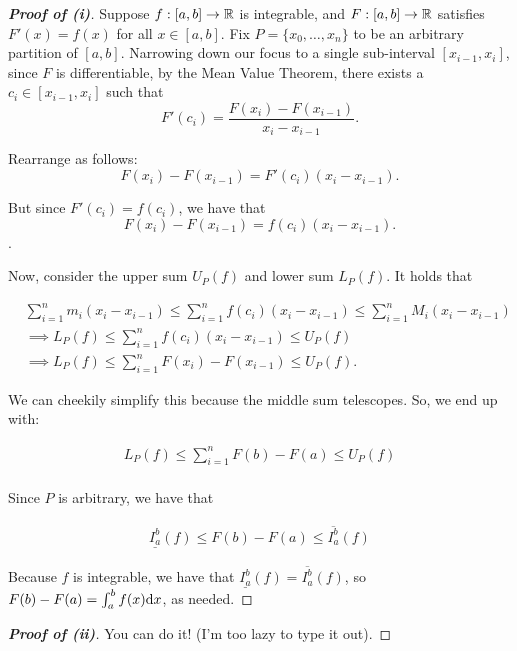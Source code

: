 \documentclass{article}
\begin{document}
  \begin{proof}[\textbf{Proof of (i)}]
    Suppose \(f:[a,b] \to \mathbb{R}\) is integrable, and \(F:[a,b] \to \mathbb{R}\) satisfies \(F'(x) = f(x)\) for all \(x \in [a,b].\) Fix \(P = \{x_0,\ldots, x_n\}\) to be an arbitrary partition of \([a,b]\). Narrowing down our focus to a single sub-interval \([x_{i-1},x_i]\), since \(F\) is differentiable, by the Mean Value Theorem, there exists a \(c_i \in [x_{i-1},x_i]\) such that
    \[
      F'(c_i) = \frac{F(x_i) - F(x_{i-1})}{x_i - x_{i-1}}.
    \] 

    Rearrange as follows:
    \[
      F(x_i) - F(x_{i-1}) = F'(c_i)(x_i - x_{i-1}).
    \]

    But since \(F'(c_i) = f(c_i)\), we have that
    \[
      F(x_i) - F(x_{i-1}) = f(c_i)(x_i - x_{i-1}). 
    \].

    Now, consider the upper sum \(U_P(f)\) and lower sum \(L_P(f)\). It holds that 

    \begin{align*}
      &\sum_{i = 1}^{n}m_i(x_i - x_{i-1}) \leq \sum_{i = 1}^{n}f(c_i)(x_i - x_{i-1}) \leq \sum_{i = 1}^{n}M_i(x_i - x_{i-1}) \\
      &\implies L_P(f) \leq \sum_{i = 1}^{n}f(c_i)(x_i - x_{i-1}) \leq U_P(f) \\
      &\implies L_P(f) \leq \sum_{i = 1}^{n}F(x_i)-F(x_{i-1}) \leq U_P(f).
    \end{align*}

    We can cheekily simplify this because the middle sum telescopes. So, we end up with:

    \begin{align*}
      L_P(f) \leq \sum_{i = 1}^{n}F(b)-F(a) \leq U_P(f) \\
    \end{align*}

    Since \(P\) is arbitrary, we have that

    \begin{align*}
      \underline{I_{a}^{b}}(f) \leq F(b) - F(a) \leq \overline{I_{a}^{b}}(f)
    \end{align*}

    Because \(f\) is integrable, we have that \(\underline{I_{a}^{b}}(f) = \overline{I_{a}^{b}}(f)\), so \(F(b) - F(a) = \int_{a}^{b}f(x) \mathrm{d} x\), as needed.
  \end{proof}

  \begin{proof}[\textbf{Proof of (ii)}]
    You can do it! (I'm too lazy to type it out).
  \end{proof}
\end{document}
